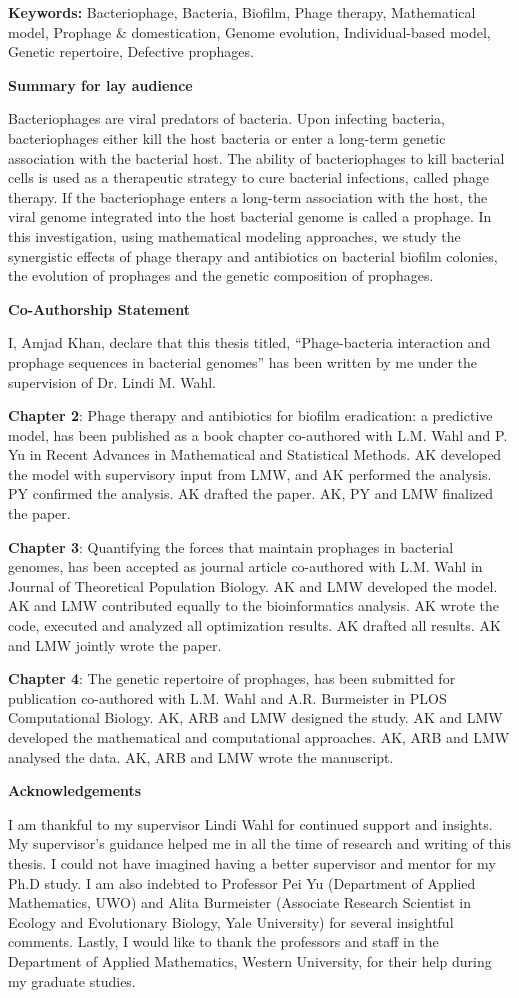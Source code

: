 \documentclass[12pt,twoside]{report}
\numberwithin{figure}{chapter}
\newenvironment{preliminary}%
{\pagestyle{plain}\pagenumbering{roman}}%
{\pagenumbering{arabic}}
\newcommand{\makecoauthor}{
I, Amjad Khan, declare that this thesis titled, “Phage-bacteria interaction and prophage sequences in bacterial genomes” has been written by me under the supervision of  Dr.  Lindi M. Wahl. 

\textbf{Chapter 2}: Phage therapy and antibiotics for biofilm eradication: a predictive model, has been published as a book chapter co-authored with L.M. Wahl and P. Yu in Recent Advances in Mathematical and Statistical Methods. AK developed the model with supervisory input from LMW, and AK performed the analysis. PY confirmed the analysis. AK drafted the paper. AK, PY and LMW finalized the paper.

\textbf{Chapter 3}: Quantifying the forces that maintain prophages in bacterial genomes, has been accepted as journal article co-authored with L.M. Wahl in Journal of Theoretical Population Biology. AK and LMW developed the model. AK and LMW contributed equally to the bioinformatics analysis. AK wrote the code, executed and analyzed all optimization results. AK drafted all results. AK and LMW jointly wrote the paper.

\textbf{Chapter 4}: The genetic repertoire of prophages, has been submitted for publication co-authored with L.M. Wahl and A.R. Burmeister in PLOS Computational Biology. AK, ARB and LMW designed the study. AK and LMW developed the mathematical and computational approaches. AK, ARB and LMW analysed the data. AK, ARB and LMW wrote the manuscript.
}
\newcommand{\makeacknowlege} {
I am thankful to my supervisor Lindi Wahl for continued support and insights. My supervisor's guidance helped me in all the time of research and writing of this thesis. I could not have imagined having a better supervisor and mentor for my Ph.D study. I am also indebted to Professor Pei Yu (Department of Applied Mathematics, UWO) and  Alita Burmeister (Associate Research Scientist in Ecology and Evolutionary Biology, Yale University) for several insightful comments.  Lastly, I would like to thank the professors and staff in the Department of Applied Mathematics, Western University, for their help during my graduate studies.
}
\begin{document}
\begin{preliminary}
\vfill
\textbf{Keywords:} Bacteriophage, Bacteria, Biofilm, Phage therapy, Mathematical model, Prophage \& domestication, Genome evolution, Individual-based model, Genetic repertoire, Defective prophages.
\newpage
{}
\Large\begin{center}\textbf{Summary for lay audience}\end{center}\normalsize

{Bacteriophages are viral predators of bacteria. Upon infecting bacteria, bacteriophages either kill the host bacteria or enter a long-term genetic association with the bacterial host. The ability of bacteriophages to kill bacterial cells is used as a therapeutic strategy to cure bacterial infections, called phage therapy.  If the bacteriophage enters a long-term association with the host, the viral genome integrated into the host bacterial genome is called a prophage. In this investigation, using mathematical modeling approaches, we study the synergistic effects of phage therapy and antibiotics on bacterial biofilm colonies, the evolution of prophages and the genetic composition of prophages.}    

\newpage
{}
\Large\begin{center}\textbf{Co-Authorship Statement}\end{center}\normalsize
\makecoauthor
\newpage
{}
\Large\begin{center}\textbf{Acknowledgements}\end{center}\normalsize
\makeacknowlege
\newpage
\tableofcontents\newpage
\newpage
{}
\listoffigures
\newpage
{}
\listoftables\newpage
{}
\listofmyappendices\newpage
\end{preliminary}

\end{document}
